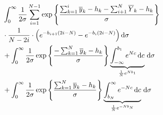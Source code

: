 \documentclass{beamer}
\newcommand{\dx}{\, \mathrm{d}}
\begin{document}
	\begin{frame}
		\begin{align}
    		& \int_0^\infty \frac{1}{2\sigma} \sum_{i = 1}^{N - 1} \exp \left
    		\{\frac{\sum_{k = 1}^i \overline{y}_k - h_k - \sum_{i + 1}^N
    		\overline{Y}_k - h_k}{\sigma} \right\} \\
    		& \cdot \frac{1}{N - 2i} \cdot \Bigl(e^{-b_{i + 1}(2i - N)} - e^{-b_i(2i - N)} \Bigr) \dx 					\sigma  \\
    		& + \int_0^\infty \frac{1}{2\sigma} \exp\left\{\frac{-\sum_{k = 1}^N 				\overline{y}_k - h_k}{\sigma} \right\} \underbrace{\int_{-\infty}^{b_1} e^{Nc} 				\dx c}_{\frac{1}{N}e^{N b_1}} \dx \sigma \\
    		&+ \int_0^\infty \frac{1}{2\sigma} \exp\left\{\frac{\sum_{k = 1}^N 					\overline{y}_k - h_k}{\sigma} \right\} \underbrace{\int_{b_N}^{\infty} e^{-Nc} 				\dx c}_{\frac{1}{N}e^{-N b_N}} \dx \sigma
		\end{align}
	\end{frame}
	
\end{document}
